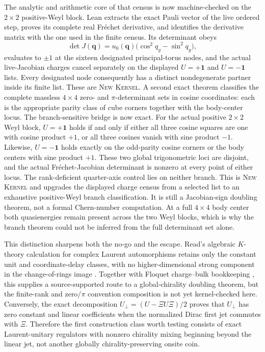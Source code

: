 \documentclass[11pt]{article}
\newcommand{\Kernel}{\textcolor{kernelcolor}{\textsc{Kernel}}}
\newcommand{\NewResult}{\textsc{New}}
\newcommand{\id}{\mathbf{1}}
\begin{document}
The analytic and arithmetic core of that census is now machine-checked on the
$2\times2$ positive-Weyl block.  Lean extracts the exact Pauli vector of the
live ordered step, proves its complete real Fr\'echet derivative, and identifies
the derivative matrix with the one used in the finite census.  Its determinant
obeys
\begin{equation}
 \det J(\mathbf q)=u_0(\mathbf q)
   \bigl(\cos^2 q_y-\sin^2 q_y\bigr),
\end{equation}
evaluates to $\pm1$ at the sixteen designated principal-torus nodes, and the
actual live-Jacobian charges cancel separately on the displayed $U=+\id$ and
$U=-\id$ lists.  Every designated node consequently has a distinct
nondegenerate partner inside its finite list.  These are \NewResult{}
\Kernel{}.  A second exact theorem classifies the complete massless
$4\times4$ zero- and $\pi$-determinant sets in cosine coordinates: each is the
appropriate parity class of cube corners together with the body-center locus.
The branch-sensitive bridge is now exact.  For the actual positive
$2\times2$ Weyl block, $U=+\id$ holds if and only if either all three cosine
squares are one with cosine product $+1$, or all three cosines vanish with
sine product $-1$.  Likewise, $U=-\id$ holds exactly on the odd-parity cosine
corners or the body centers with sine product $+1$.  These two global
trigonometric loci are disjoint, and the actual Fr\'echet-Jacobian determinant
is nonzero at every point of either locus.  The rank-deficient quarter-axis
control lies on neither branch.  This is \NewResult{} \Kernel{} and upgrades
the displayed charge census from a selected list to an exhaustive positive-Weyl
branch classification.  It is still a Jacobian-sign doubling theorem, not a
formal Chern-number computation.  At a full $4\times4$ body center both
quasienergies remain present across the two Weyl blocks, which is why the
branch theorem could not be inferred from the full determinant set alone.

This distinction sharpens both the no-go and the escape.  Read's algebraic
$K$-theory calculation for complex Laurent automorphisms retains only the
constant unit and coordinate-delay classes, with no higher-dimensional strong
component in the change-of-rings image \cite{ReadLaurentKTheory}.  Together
with Floquet charge--bulk bookkeeping \cite{BesshoSatoFloquet}, this supplies a
source-supported route to a global-chirality doubling theorem, but the
finite-rank and zero/$\pi$ convention composition is not yet kernel-checked
here.  Conversely, the exact decomposition
$U_\perp=(U-\Xi U\Xi)/2$ proves that $U_\perp$ has zero constant and linear
coefficients when the normalized Dirac first jet commutes with $\Xi$.
Therefore the first construction class worth testing consists of exact
Laurent-unitary regulators with nonzero chirality mixing beginning beyond the
linear jet, not another globally chirality-preserving onsite coin.
\end{document}
